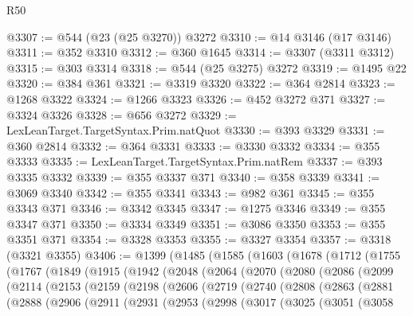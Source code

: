\begin{lexlean}{R50}
\begin{coremodule}
@3307 := @544 (@23 (@25 @3270)) @3272
@3310 := @14 @3146 (@17 @3146)
@3311 := @352 @3310
@3312 := @360 @1645
@3314 := @3307 (@3311 @3312)
@3315 := @303 @3314
@3318 := @544 (@25 @3275) @3272
@3319 := @1495 @22
@3320 := @384 @361
@3321 := @3319 @3320
@3322 := @364 @2814
@3323 := @1268 @3322
@3324 := @1266 @3323
@3326 := @452 @3272 @371
@3327 := @3324 @3326
@3328 := @656 @3272
@3329 := LexLeanTarget.TargetSyntax.Prim.natQuot
@3330 := @393 @3329
@3331 := @360 @2814
@3332 := @364 @3331
@3333 := @3330 @3332
@3334 := @355 @3333
@3335 := LexLeanTarget.TargetSyntax.Prim.natRem
@3337 := @393 @3335 @3332
@3339 := @355 @3337 @371
@3340 := @358 @3339
@3341 := @3069 @3340
@3342 := @355 @3341
@3343 := @982 @361
@3345 := @355 @3343 @371
@3346 := @3342 @3345
@3347 := @1275 @3346
@3349 := @355 @3347 @371
@3350 := @3334 @3349
@3351 := @3086 @3350
@3353 := @355 @3351 @371
@3354 := @3328 @3353
@3355 := @3327 @3354
@3357 := @3318 (@3321 @3355)
@3406 := @1399
    (@1485
      (@1585
        (@1603
          (@1678
            (@1712
              (@1755
                (@1767
                  (@1849
                    (@1915
                      (@1942
                        (@2048
                          (@2064
                            (@2070
                              (@2080
                                (@2086
                                  (@2099
                                    (@2114
                                      (@2153
                                        (@2159
                                          (@2198
                                            (@2606
                                              (@2719
                                                (@2740
                                                  (@2808
                                                    (@2863
                                                      (@2881
                                                        (@2888
                                                          (@2906
                                                            (@2911
                                                              (@2931
                                                                (@2953
                                                                  (@2998
                                                                    (@3017
                                                                      (@3025
                                                                        (@3051
                                                                          (@3058

\end{coremodule}
\end{lexlean}
